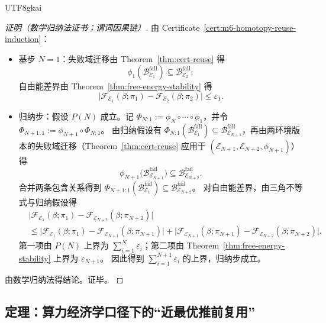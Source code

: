 \documentclass[12pt]{article}
\begin{document}
\begin{CJK*}{UTF8}{gkai}
\begin{proof}[证明（数学归纳法证书；谓词因果链）]
由 Certificate~\ref{cert:m6-homotopy-reuse-induction}：
\begin{itemize}
  \item 基步 $N=1$：失败域迁移由 Theorem~\ref{thm:cert-reuse} 得
  \[
  \phi_1(\mathcal{B}^{\mathrm{fail}}_{\mathcal{E}_1})\subseteq \mathcal{B}^{\mathrm{fail}}_{\mathcal{E}_2};
  \]
  自由能差界由 Theorem~\ref{thm:free-energy-stability} 得
  \[
  \bigl|\mathcal{F}_{\mathcal{E}_1}(\beta;\pi_1)-\mathcal{F}_{\mathcal{E}_2}(\beta;\pi_2)\bigr|\le \varepsilon_1.
  \]
  \item 归纳步：假设 $P(N)$ 成立。记 $\Phi_{N:1}:=\phi_N\circ\cdots\circ\phi_1$，并令 $\Phi_{N+1:1}:=\phi_{N+1}\circ \Phi_{N:1}$。
  由归纳假设有 $\Phi_{N:1}(\mathcal{B}^{\mathrm{fail}}_{\mathcal{E}_1})\subseteq \mathcal{B}^{\mathrm{fail}}_{\mathcal{E}_{N+1}
    }$，再由两环境版本的失败域迁移（Theorem~\ref{thm:cert-reuse} 应用于 $(\mathcal{E}_{N+1},\mathcal{E}_{N+2},\phi_{N+1})$）得
  \[
  \phi_{N+1}\bigl(\mathcal{B}^{\mathrm{fail}}_{\mathcal{E}_{N+1}}\bigr)\subseteq \mathcal{B}^{\mathrm{fail}}_{\mathcal{E}
    _{N+2}}.
  \]
  合并两条包含关系得到 $\Phi_{N+1:1}(\mathcal{B}^{\mathrm{fail}}_{\mathcal{E}_1})\subseteq \mathcal{B}^{\mathrm{fail}}_{\mathcal{E}
    _{N+2}}$。
  对自由能差界，由三角不等式与归纳假设得
  \[
  \begin{aligned}
  &\bigl|\mathcal{F}_{\mathcal{E}_1}(\beta;\pi_1)-\mathcal{F}_{\mathcal{E}_{N+2}}(\beta;\pi_{N+2})\bigr|\\
  &\le
  \bigl|\mathcal{F}_{\mathcal{E}_1}(\beta;\pi_1)-\mathcal{F}_{\mathcal{E}_{N+1}}(\beta;\pi_{N+1})\bigr|
  +
  \bigl|\mathcal{F}_{\mathcal{E}_{N+1}}(\beta;\pi_{N+1})-\mathcal{F}_{\mathcal{E}_{N+2}}(\beta;\pi_{N+2})\bigr|.
  \end{aligned}
  \]
  第一项由 $P(N)$ 上界为 $\sum_{i=1}^{N}\varepsilon_i$；第二项由 Theorem~\ref{thm:free-energy-stability} 上界为 $\varepsilon_{N+1}$。
  因此得到 $\sum_{i=1}^{N+1}\varepsilon_i$ 的上界，归纳步成立。
\end{itemize}
由数学归纳法得结论。证毕。
\end{proof}

\subsection{定理：算力经济学口径下的“近最优推前复用”}


\end{CJK*}
\end{document}
